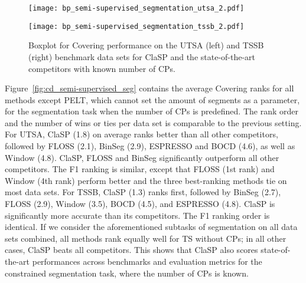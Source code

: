 \documentclass[pdflatex,sn-basic]{sn-jnl}
\begin{document}
\begin{figure}[t]
	\begin{minipage}{6cm}
        \texttt{[image: bp\_semi-supervised\_segmentation\_utsa\_2.pdf]}
	\end{minipage}
	\begin{minipage}{6cm}
        \texttt{[image: bp\_semi-supervised\_segmentation\_tssb\_2.pdf]}
	\end{minipage}
	\caption{Boxplot for Covering performance on the  UTSA (left) and  TSSB (right) benchmark data sets for ClaSP and the state-of-the-art competitors with known number of CPs.\label{fig:boxplot_semi-supervised_seg}
	}
\end{figure}

Figure~\ref{fig:cd_semi-supervised_seg} contains the average Covering ranks for all methods except PELT, which cannot set the amount of segments as a parameter, for the segmentation task when the number of CPs is predefined. The rank order and the number of wins or ties per data set is comparable to the previous setting. For UTSA, ClaSP (1.8) on average ranks better than all other competitors, followed by FLOSS (2.1), BinSeg (2.9), ESPRESSO and BOCD (4.6), as well as Window (4.8). ClaSP, FLOSS and BinSeg significantly outperform all other competitors. The F1 ranking is similar, except that FLOSS (1st rank) and Window (4th rank) perform better and the three best-ranking methods tie on most data sets. For TSSB, ClaSP (1.3) ranks first, followed by BinSeg (2.7), FLOSS (2.9), Window (3.5), BOCD (4.5), and ESPRESSO (4.8). ClaSP is significantly more accurate than its competitors. The F1 ranking order is identical. If we consider the aforementioned subtasks of segmentation on all  data sets combined, all methods rank equally well for TS without CPs; in all other cases, ClaSP beats all competitors. This shows that ClaSP also scores state-of-the-art performances across benchmarks and evaluation metrics for the constrained segmentation task, where the number of CPs is known.
\end{document}
